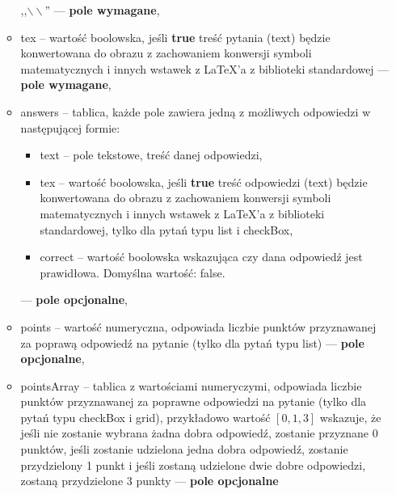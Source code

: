 \begin{itemize}
\begin{itemize}
    ,,$\backslash\backslash$'' --- \textbf{pole wymagane},
    \item{tex} -- wartość boolowska, jeśli \textbf{true} treść pytania (text) będzie
    konwertowana do obrazu z zachowaniem konwersji symboli matematycznych i innych
    wstawek z \LaTeX{}'a z biblioteki standardowej --- \textbf{pole wymagane},
    \item{answers} -- tablica, każde pole zawiera jedną z możliwych odpowiedzi w
    następującej formie:
    \begin{itemize}
      \item text -- pole tekstowe, treść danej odpowiedzi,
      \item tex -- wartość boolowska, jeśli \textbf{true} treść odpowiedzi (text) będzie
      konwertowana do obrazu z zachowaniem konwersji symboli matematycznych i innych
      wstawek z \LaTeX{}'a z biblioteki standardowej, tylko dla pytań typu list i checkBox,
      \item correct -- wartość boolowska wskazująca czy dana odpowiedź jest prawidłowa.
      Domyślna wartość: false.
    \end{itemize} 
    --- \textbf{pole opcjonalne},
    \item{points} -- wartość numeryczna, odpowiada liczbie punktów przyznawanej za
    poprawą odpowiedź na pytanie (tylko dla pytań typu list)
    --- \textbf{pole opcjonalne},
    \item{pointsArray} -- tablica z wartościami numeryczymi, odpowiada liczbie punktów
    przyznawanej za poprawne odpowiedzi na pytanie (tylko dla pytań typu checkBox i grid),
    przykładowo wartość $ [0, 1, 3] $ wskazuje, że jeśli nie zostanie wybrana żadna dobra
    odpowiedź, zostanie przyznane 0 punktów, jeśli zostanie udzielona jedna dobra odpowiedź,
    zostanie przydzielony 1 punkt i jeśli zostaną udzielone dwie dobre odpowiedzi, zostaną
    przydzielone 3 punkty
    --- \textbf{pole opcjonalne}
  \end{itemize}
\end{itemize}

